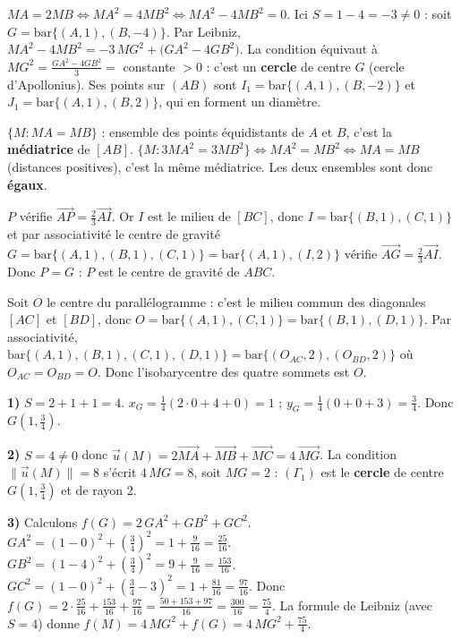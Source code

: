 $MA=2MB\Leftrightarrow MA^{2}=4MB^{2}\Leftrightarrow MA^{2}-4MB^{2}=0$. Ici $S=1-4=-3\neq0$ : soit $G=\mathrm{bar}\{(A,1),(B,-4)\}$. Par Leibniz, $MA^{2}-4MB^{2}=-3\,MG^{2}+\big(GA^{2}-4GB^{2}\big)$. La condition équivaut à $MG^{2}=\frac{GA^{2}-4GB^{2}}{3}=$ constante $>0$ : c'est un \textbf{cercle} de centre $G$ (cercle d'Apollonius). Ses points sur $(AB)$ sont $I_1=\mathrm{bar}\{(A,1),(B,-2)\}$ et $J_1=\mathrm{bar}\{(A,1),(B,2)\}$, qui en forment un diamètre.

$\{M:MA=MB\}$ : ensemble des points équidistants de $A$ et $B$, c'est la \textbf{médiatrice} de $[AB]$.
$\{M:3MA^2=3MB^2\}\Leftrightarrow MA^2=MB^2\Leftrightarrow MA=MB$ (distances positives), c'est la même médiatrice. Les deux ensembles sont donc \textbf{égaux}.

$P$ vérifie $\overrightarrow{AP}=\frac23\overrightarrow{AI}$. Or $I$ est le milieu de $[BC]$, donc $I=\mathrm{bar}\{(B,1),(C,1)\}$ et par associativité le centre de gravité $G=\mathrm{bar}\{(A,1),(B,1),(C,1)\}=\mathrm{bar}\{(A,1),(I,2)\}$ vérifie $\overrightarrow{AG}=\frac{2}{3}\overrightarrow{AI}$. Donc $P=G$ : $P$ est le centre de gravité de $ABC$.

Soit $O$ le centre du parallélogramme : c'est le milieu commun des diagonales $[AC]$ et $[BD]$, donc $O=\mathrm{bar}\{(A,1),(C,1)\}=\mathrm{bar}\{(B,1),(D,1)\}$. Par associativité, $\mathrm{bar}\{(A,1),(B,1),(C,1),(D,1)\}=\mathrm{bar}\{(O_{AC},2),(O_{BD},2)\}$ où $O_{AC}=O_{BD}=O$. Donc l'isobarycentre des quatre sommets est $O$.

\textbf{1)} $S=2+1+1=4$. $x_G=\frac14(2\cdot0+4+0)=1$ ; $y_G=\frac14(0+0+3)=\frac34$. Donc $G\!\left(1,\frac34\right)$.

\textbf{2)} $S=4\neq0$ donc $\vec u(M)=2\overrightarrow{MA}+\overrightarrow{MB}+\overrightarrow{MC}=4\,\overrightarrow{MG}$. La condition $\|\vec u(M)\|=8$ s'écrit $4\,MG=8$, soit $MG=2$ : $(\Gamma_1)$ est le \textbf{cercle} de centre $G\!\left(1,\frac34\right)$ et de rayon $2$.

\textbf{3)} Calculons $f(G)=2\,GA^{2}+GB^{2}+GC^{2}$.
$GA^{2}=(1-0)^{2}+\left(\frac34\right)^{2}=1+\frac{9}{16}=\frac{25}{16}$.
$GB^{2}=(1-4)^{2}+\left(\frac34\right)^{2}=9+\frac{9}{16}=\frac{153}{16}$.
$GC^{2}=(1-0)^{2}+\left(\frac34-3\right)^{2}=1+\frac{81}{16}=\frac{97}{16}$.
Donc $f(G)=2\cdot\frac{25}{16}+\frac{153}{16}+\frac{97}{16}=\frac{50+153+97}{16}=\frac{300}{16}=\frac{75}{4}$.
La formule de Leibniz (avec $S=4$) donne $f(M)=4\,MG^{2}+f(G)=4\,MG^{2}+\frac{75}{4}$.

